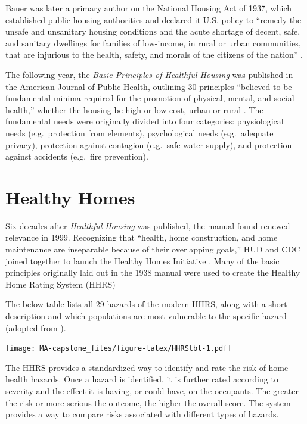 \documentclass[
]{book}
\begin{document}
Bauer was later a primary author on the National Housing Act of 1937, which established public housing authorities and declared it U.S. policy to ``remedy the unsafe and unsanitary housing conditions and the acute shortage of decent, safe, and sanitary dwellings for families of low-income, in rural or urban communities, that are injurious to the health, safety, and morals of the citizens of the nation'' \citep{mccarty2019}.

The following year, the \emph{Basic Principles of Healthful Housing} was published in the American Journal of Public Health, outlining 30 principles ``believed to be fundamental minima required for the promotion of physical, mental, and social health,'' whether the housing be high or low cost, urban or rural \citep{apha1938}. The fundamental needs were originally divided into four categories: physiological needs (e.g.~protection from elements), psychological needs (e.g.~adequate privacy), protection against contagion (e.g.~safe water supply), and protection against accidents (e.g.~fire prevention).

\hypertarget{healthy-homes}{%
\section{Healthy Homes}\label{healthy-homes}}

Six decades after \emph{Healthful Housing} was published, the manual found renewed relevance in 1999. Recognizing that ``health, home construction, and home maintenance are inseparable because of their overlapping goals,'' HUD and CDC joined together to launch the Healthy Homes Initiative \citep[ 31, 34]{cdc2006}. Many of the basic principles originally laid out in the 1938 manual were used to create the Healthy Home Rating System (HHRS)

The below table lists all 29 hazards of the modern HHRS, along with a short description and which populations are most vulnerable to the specific hazard (adopted from \citet{HHRSlst} ).

\texttt{[image: MA-capstone\_files/figure-latex/HHRStbl-1.pdf]}

The HHRS provides a standardized way to identify and rate the risk of home health hazards. Once a hazard is identified, it is further rated according to severity and the effect it is having, or could have, on the occupants. The greater the risk or more serious the outcome, the higher the overall score. The system provides a way to compare risks associated with different types of hazards.
\end{document}
